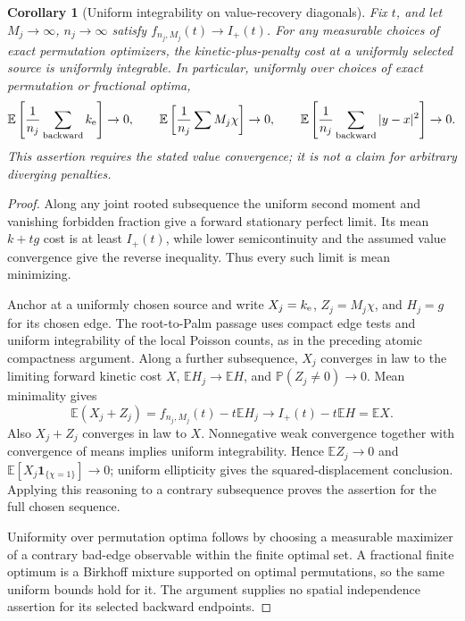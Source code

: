 \documentclass[11pt,reqno]{amsart}
\newtheorem{corollary}[theorem]{Corollary}
\theoremstyle{definition}
\theoremstyle{remark}
\numberwithin{equation}{section}
\newcommand{\E}{\mathbb E}
\begin{document}
\begin{corollary}[Uniform integrability on value-recovery diagonals]
\label{forward-full-diagonal-ui}
Fix \(t\), and let \(M_j\to\infty\), \(n_j\to\infty\) satisfy
\(f_{n_j,M_j}(t)\to I_+(t)\). For any measurable choices of exact
permutation optimizers, the kinetic-plus-penalty cost at a uniformly selected
source is uniformly integrable. In particular, uniformly over choices of
exact permutation or fractional optima,
\[
 \E\left[\frac1{n_j}\sum_{\rm backward}k_{\rm e}\right]\to0,
 \qquad
 \E\left[\frac1{n_j}\sum M_j\chi\right]\to0,
 \qquad
 \E\left[\frac1{n_j}\sum_{\rm backward}|y-x|^2\right]\to0.
\]
This assertion requires the stated value convergence; it is not a claim
for arbitrary diverging penalties.
\end{corollary}
\begin{proof}
Along any joint rooted subsequence the uniform second moment and vanishing
forbidden fraction give a forward stationary perfect limit. Its mean
\(k+t g\) cost is at least \(I_+(t)\), while lower semicontinuity and
the assumed value convergence give the reverse inequality. Thus every
such limit is mean minimizing.

Anchor at a uniformly chosen source and write \(X_j=k_{\rm e}\),
\(Z_j=M_j\chi\), and \(H_j=g\) for its chosen edge. The
root-to-Palm passage uses compact edge tests and uniform integrability
of the local Poisson counts, as in the preceding atomic compactness
argument. Along a further subsequence, \(X_j\) converges in law to the
limiting forward kinetic cost \(X\), \(\E H_j\to\E H\), and
\(\mathbb P(Z_j\ne0)\to0\). Mean minimality gives
\[
 \E(X_j+Z_j)=f_{n_j,M_j}(t)-t\E H_j
         \longrightarrow I_+(t)-t\E H=\E X.
\]
Also \(X_j+Z_j\) converges in law to \(X\). Nonnegative weak
convergence together with convergence of means implies uniform
integrability. Hence \(\E Z_j\to0\) and
\(\E[X_j\mathbf1_{\{\chi=1\}}]\to0\); uniform ellipticity gives
the squared-displacement conclusion. Applying this reasoning to a
contrary subsequence proves the assertion for the full chosen sequence.

Uniformity over permutation optima follows by choosing a measurable
maximizer of a contrary bad-edge observable within the finite optimal set.
A fractional finite optimum is a Birkhoff mixture supported on optimal
permutations, so the same uniform bounds hold for it. The argument supplies
no spatial independence assertion for its selected backward endpoints.
\end{proof}
\end{document}
